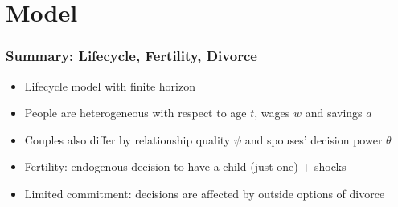 \documentclass[aspectratio=169]{beamer}
\let\olditem\item
\renewcommand{\item}{%
\olditem\vspace{\fill}}
\begin{document}
%
%



\section{Model}
\begin{frame}
\frametitle{Summary: Lifecycle, Fertility, Divorce}
\begin{itemize}
\item Lifecycle model with finite horizon
\item People are heterogeneous with respect to age $t$, wages $w$ and savings $a$
\item Couples also differ by relationship quality $\psi$ and spouses' decision power $\theta$
\item Fertility: endogenous decision to have a child (just one) + shocks
\item Limited commitment: decisions are affected by outside options of divorce
\end{itemize}
\end{frame}
\end{document}
